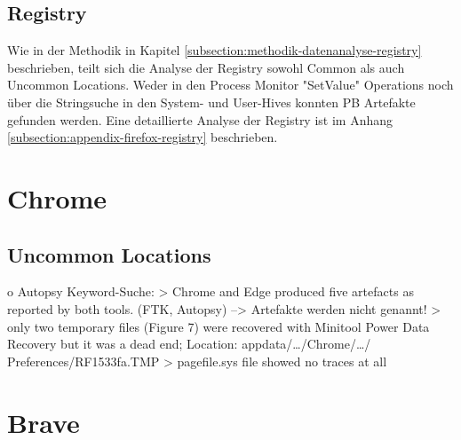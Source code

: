 \subsection*{Registry}
Wie in der Methodik in Kapitel \ref{subsection:methodik-datenanalyse-registry} beschrieben, teilt sich die Analyse der Registry sowohl Common als auch Uncommon Locations. Weder in den Process Monitor "SetValue" Operations noch über die Stringsuche in den System- und User-Hives konnten PB Artefakte gefunden werden. Eine detaillierte Analyse der Registry ist im Anhang \ref{subsection:appendix-firefox-registry} beschrieben. 

\section{Chrome}

\subsection*{Uncommon Locations}

o Autopsy Keyword-Suche: 
	> Chrome and Edge produced five artefacts as reported by both tools. (FTK, Autopsy) \cite{Gabet.2018}
		--> Artefakte werden nicht genannt!
	> only two temporary files (Figure 7) were recovered with Minitool Power Data Recovery but it was a dead end; Location: appdata/…/Chrome/…/ Preferences/RF1533fa.TMP \cite{Fayyad.2021}
	> pagefile.sys file showed no traces at all \cite{Said.2011}
	

\section{Brave}